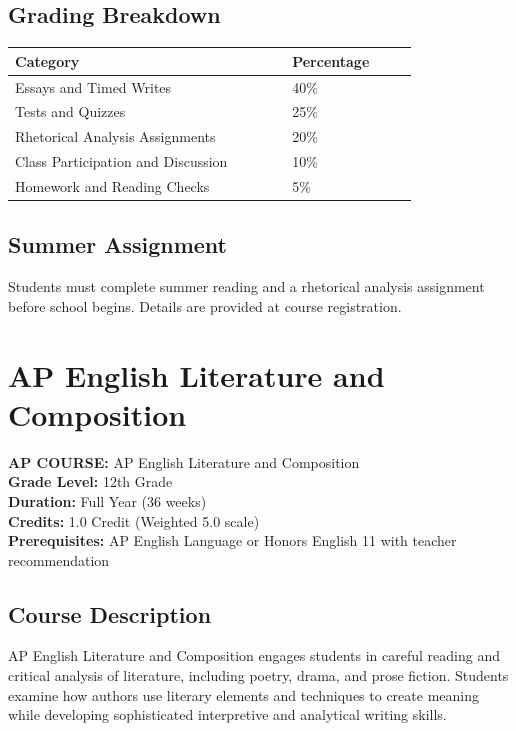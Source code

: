 \documentclass[12pt,oneside]{book}
\begin{document}
\section{Grading Breakdown}
\begin{center}
\begin{tabular}{L{0.55\linewidth}L{0.25\linewidth}}
\toprule
\textbf{Category} & \textbf{Percentage} \\
\midrule
Essays and Timed Writes & 40\% \\
Tests and Quizzes & 25\% \\
Rhetorical Analysis Assignments & 20\% \\
Class Participation and Discussion & 10\% \\
Homework and Reading Checks & 5\% \\
\bottomrule
\end{tabular}
\end{center}

\section{Summer Assignment}
Students must complete summer reading and a rhetorical analysis assignment before school begins.
Details are provided at course registration.

\chapter{AP English Literature and Composition}

\noindent\textbf{AP COURSE:} AP English Literature and Composition\\
\textbf{Grade Level:} 12th Grade\\
\textbf{Duration:} Full Year (36 weeks)\\
\textbf{Credits:} 1.0 Credit (Weighted 5.0 scale)\\
\textbf{Prerequisites:} AP English Language or Honors English 11 with teacher recommendation

\section{Course Description}
AP English Literature and Composition engages students in careful reading and critical analysis of
literature, including poetry, drama, and prose fiction. Students examine how authors use literary
elements and techniques to create meaning while developing sophisticated interpretive and analytical
writing skills.
\end{document}
